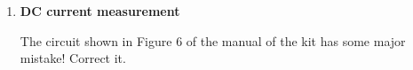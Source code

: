 \begin{enumerate}
  \begin{comment}
  {\bf Solution:}

  Pick any two of the four scales, e.g., 10V and 50V, and get
  \[
  10\;\frac{R_{AV}}{R17+R_{AV}}=50\;\frac{R_{AV}}{R17+R16+R_{AV}}
  \]
  i.e.,
  \[
  10\;\frac{R_{AV}}{83.3+R_{AV}}=50\;\frac{R_{AV}}{443.3+R_{AV}}
  \]
  Solving for $R_{AV}$ we get $R_{AV}=6.7\;k\Omega$. Alternatively, we can 
  pick another pair of 250V and 1000V, and get
  \[
  250\;\frac{R_{AV}}{R17+R16+R15+R_{AV}}=1000\;\frac{R_{AV}}{R17+R16+R15+R14+R_{AV}},
  \]
  i.e.,
  \[
  250\;\frac{R_{AV}}{2243.3+R_{AV}}=1000\;\frac{R_{AV}}{8993.3+R_{AV}}
  \]
  Solving for $R_{AV}$ we again get $R_{AV}=6.7\;k\Omega$. 
  
  As we know $R_M=1.76\;k\Omega$, the resistance of D1 must be 
  $R_D=6.7-1.76=4.94\;k\Omega$. Correspondingly, at the full display with
  $I_m=50\;\mu A$, the voltages across D1 is
  $V_D=I_m R_D=0.05\times 4.94=0.247\;V$. As $V_m=0.088\;V$, the total
  voltage across the meter-head and D1 is $V_D+V_m=0.335\;V$.

  Any AC voltage to be measured needs to be rectified (half-wave) and then
  converted to the average DC value. When the AC voltage is $1\;V$, its
  peak value is $V_p=\sqrt{2}=1.4142\;V$, the average DC value after
  half-wave rectification is 
  \[
  V_{AV}=\sqrt{2}\times \frac{2}{\pi}\times\frac{1}{2}
  =\frac{\sqrt{2}}{\pi}\approx\frac{1.4142}{3.1416}=0.4502\;V
  \]
  We can show that in each of the four AC voltage scales, the meter-head
  has a full scale display:
  \begin{itemize}
  \item 10V
    \[
    I_m=\frac{10\times 0.4502}{6.7+83.3}=\frac{4.5}{90}=0.05\;mA
    \]
  \item 50V
    \[
    I_m=\frac{50\times 0.4502}{6.7+83.3+360}=\frac{22.51}{450}=0.05\;mA
    \]
  \item 250V
    \[
    I_m=\frac{250\times 0.4502}{6.7+83.3+360+1800}=\frac{112.55}{2250}=0.05\;mA
    \]
  \item 1000V
    \[
    I_m=\frac{1000\times 0.4502}{6.7+83.3+360+1800+6750}=\frac{450}{9000}=0.05\;mA
    \]
  \end{itemize}
  \end{comment}

\item {\bf DC current measurement}

  The circuit shown in Figure 6 of the manual of the kit has some major
  mistake! Correct it.


\end{enumerate}
